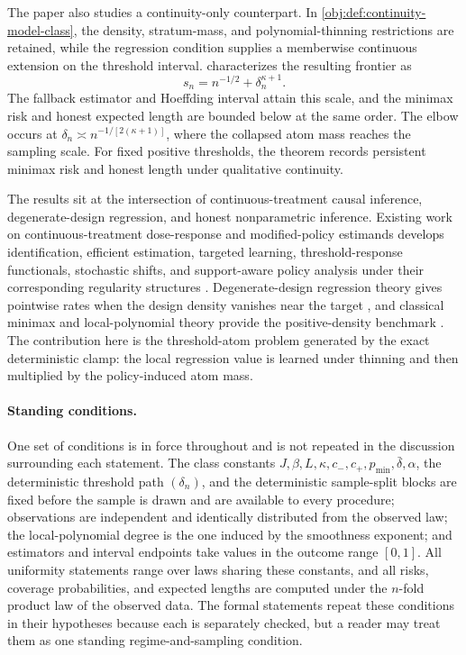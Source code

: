 The paper also studies a continuity-only counterpart. In \cref{obj:def:continuity-model-class}, the density, stratum-mass, and polynomial-thinning restrictions are retained, while the regression condition supplies a memberwise continuous extension on the threshold interval.  characterizes the resulting frontier as
\[
s_n=n^{-1/2}+\delta_n^{\kappa+1}.
\]
The fallback estimator and Hoeffding interval attain this scale, and the minimax risk and honest expected length are bounded below at the same order. The elbow occurs at \(\delta_n\asymp n^{-1/[2(\kappa+1)]}\), where the collapsed atom mass reaches the sampling scale. For fixed positive thresholds, the theorem records persistent minimax risk and honest length under qualitative continuity.

The results sit at the intersection of continuous-treatment causal inference, degenerate-design regression, and honest nonparametric inference. Existing work on continuous-treatment dose-response and modified-policy estimands develops identification, efficient estimation, targeted learning, threshold-response functionals, stochastic shifts, and support-aware policy analysis under their corresponding regularity structures \citep{Imbens2000,Hirano2005,Imai2004,KennedyMaMcHughSmall2017,vanderLaanZhangGilbert2023,Diaz2026,Koo2026,McCoyZhangHubbardvanderLaanSchuler2026}. Degenerate-design regression theory gives pointwise rates when the design density vanishes near the target \citep{Gaiffas2005DegenerateDesign,Gaiffas2007Inhomogeneous}, and classical minimax and local-polynomial theory provide the positive-density benchmark \citep{Stone1982,Fan1996,Tsybakov2009}. The contribution here is the threshold-atom problem generated by the exact deterministic clamp: the local regression value is learned under thinning and then multiplied by the policy-induced atom mass.

\paragraph{Standing conditions.}
One set of conditions is in force throughout and is not repeated in the discussion surrounding each statement. The class constants \(J,\beta,L,\kappa,c_-,c_+,p_{\min},\bar\delta,\alpha\), the deterministic threshold path \((\delta_n)\), and the deterministic sample-split blocks are fixed before the sample is drawn and are available to every procedure; observations are independent and identically distributed from the observed law; the local-polynomial degree is the one induced by the smoothness exponent; and estimators and interval endpoints take values in the outcome range \([0,1]\). All uniformity statements range over laws sharing these constants, and all risks, coverage probabilities, and expected lengths are computed under the \(n\)-fold product law of the observed data. The formal statements repeat these conditions in their hypotheses because each is separately checked, but a reader may treat them as one standing regime-and-sampling condition.

